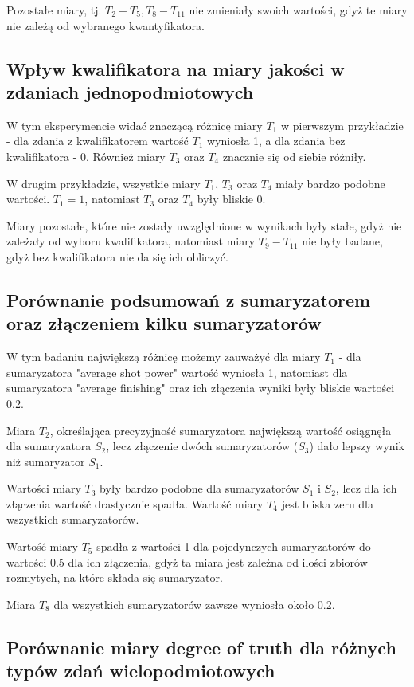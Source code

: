 \documentclass{classrep}
\begin{document}
	Pozostałe miary, tj. $T_2 - T_5, T_8 - T_{11}$ nie zmieniały swoich wartości, gdyż te miary nie zależą od wybranego kwantyfikatora.
	
	\subsection{Wpływ kwalifikatora na miary jakości w zdaniach jednopodmiotowych}
	W tym eksperymencie widać znaczącą różnicę miary $T_1$ w pierwszym przykładzie - dla zdania z kwalifikatorem wartość $T_1$ wyniosła 1, a dla zdania bez kwalifikatora - 0. Również miary $T_3$ oraz $T_4$ znacznie się od siebie różniły.
	
	W drugim przykładzie, wszystkie miary $T_1$, $T_3$ oraz $T_4$ miały bardzo podobne wartości. $T_1 = 1$, natomiast $T_3$ oraz $T_4$ były bliskie 0.
	
	Miary pozostałe, które nie zostały uwzględnione w wynikach były stałe, gdyż nie zależały od wyboru kwalifikatora, natomiast miary $T_9 - T_{11}$ nie były badane, gdyż bez kwalifikatora nie da się ich obliczyć.
	
	\subsection{Porównanie podsumowań z sumaryzatorem oraz złączeniem kilku sumaryzatorów}
	W tym badaniu największą różnicę możemy zauważyć dla miary $T_1$ - dla sumaryzatora "average shot power" wartość wyniosła 1, natomiast dla sumaryzatora "average finishing" oraz ich złączenia wyniki były bliskie wartości 0.2. 
	
	Miara $T_2$, określająca precyzyjność sumaryzatora największą wartość osiągnęła dla sumaryzatora $S_2$, lecz złączenie dwóch sumaryzatorów ($S_3$) dało lepszy wynik niż sumaryzator $S_1$. 
	
	Wartości miary $T_3$ były bardzo podobne dla sumaryzatorów $S_1$ i $S_2$, lecz dla ich złączenia wartość drastycznie spadła. Wartość miary $T_4$ jest bliska zeru dla wszystkich sumaryzatorów.	
	 
	Wartość miary $T_5$ spadła z wartości 1 dla pojedynczych sumaryzatorów do wartości 0.5 dla ich złączenia, gdyż ta miara jest zależna od ilości zbiorów rozmytych, na które składa się sumaryzator.
	
	Miara $T_8$ dla wszystkich sumaryzatorów zawsze wyniosła około 0.2.
	
	\subsection{Porównanie miary degree of truth dla różnych typów zdań wielopodmiotowych}
	
\end{document}
